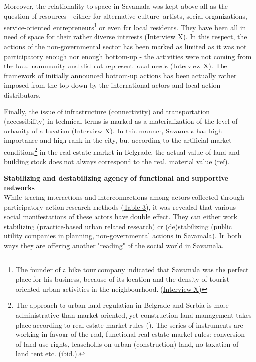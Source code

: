 \documentclass[11pt]{report}
\begin{document}
Moreover, the relationality to space in Savamala was kept above all as the question of resources - either for alternative culture, artists, social organizations, service-oriented entrepreneurs\footnote{The founder of a bike tour company indicated that Savamala was the perfect place for his business, because of its location and the density of tourist-oriented urban activities in the neighbourhood. (\href{InterviewX}{Interview X})}
or even for local residents.
They have been all in need of space for their rather diverse interests (\href{InterviewX}{Interview X}).
In this respect, the actions of the non-governmental sector has been marked as limited as it was not  participatory enough nor enough bottom-up - the activities were not coming from the local community and did not represent local needs (\href{InterviewX}{Interview X}).
The framework of initially announced bottom-up actions has been actually rather imposed from the top-down by the international actors and local action distributors.

Finally, the issue of infrastructure (connectivity) and transportation (accessibility) in technical terms is marked as a materialization of the level of urbanity of a location (\href{InterviewX}{Interview X}).
In this manner, Savamala has high importance and high rank in the city, but according to the artificial market conditions\footnote{
The approach to urban land regulation in Belgrade and Serbia is more administrative than market-oriented, yet construction land management takes place according to real-estate market rules (\cite{Zekovic and Maricic, 2017 land market}). The series of instruments are working in favour of the real, functional real estate market rules: conversion of land-use rights, leaseholds on urban (construction) land, no taxation of land rent etc. (ibid.).}
in the real-estate market in Belgrade, the actual value of land and building stock does not always correspond to the real, material value (\href{ref}{ref}).

\textbf{Stabilizing and destabilizing agency of functional and supportive networks}
\\
While tracing interactions and interconnections among actors collected through participatory action research methods (\href{ref}{Table 3}), it was revealed that various social manifestations of these actors have double effect. They can either work stabilizing (practice-based urban related research) or (de)stabilizing (public utility companies in planning, non-governmental actions in Savamala).
In both ways they are offering another "reading" of the social world in Savamala.
\end{document}

